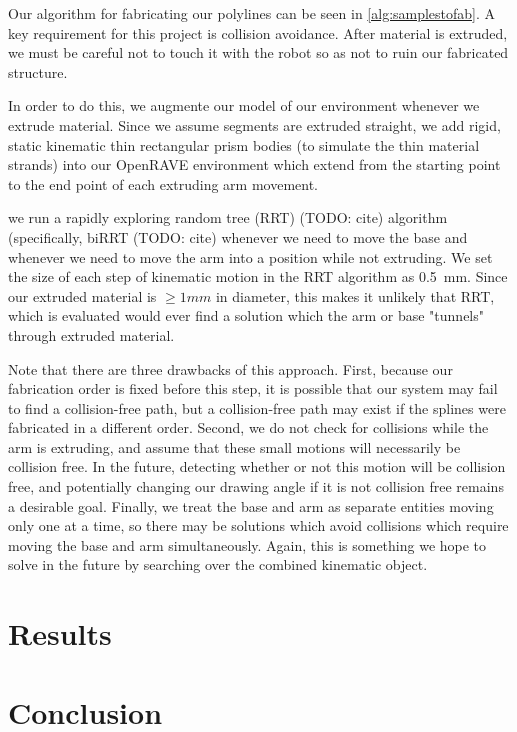 \documentclass[conference]{acmsiggraph}
\begin{document}
Our algorithm for fabricating our polylines can be seen in \ref{alg:samplestofab}.  A key requirement for this project is collision avoidance.  After material is extruded, we must be careful not to touch it with the robot so as not to ruin our fabricated structure.

In order to do this, we augmente our model of our environment whenever we extrude material.  Since we assume segments are extruded straight, we add rigid, static kinematic thin rectangular prism bodies (to simulate the thin material strands) into our OpenRAVE environment which extend from the starting point to the end point of each extruding arm movement.

we run a rapidly exploring random tree (RRT) (TODO: cite) algorithm (specifically, biRRT (TODO: cite) whenever we need to move the base and whenever we need to move the arm into a position while not extruding.  We set the size of each step of kinematic motion in the RRT algorithm as 0.5~mm.  Since our extruded material is $\geq 1mm$ in diameter, this makes it unlikely that RRT, which is evaluated would ever find a solution which the arm or base "tunnels" through extruded material.

Note that there are three drawbacks of this approach. First, because our fabrication order is fixed before this step, it is possible that our system may fail to find a collision-free path, but a collision-free path may exist if the splines were fabricated in a different order.  Second, we do not check for collisions while the arm is extruding, and assume that these small motions will necessarily be collision free.  In the future, detecting whether or not this motion will be collision free, and potentially changing our drawing angle if it is not collision free remains a desirable goal.  Finally, we treat the base and arm as separate entities moving only one at a time, so there may be solutions which avoid collisions which require moving the base and arm simultaneously.  Again, this is something we hope to solve in the future by searching over the combined kinematic object.

\section{Results}

\section{Conclusion}
\end{document}
